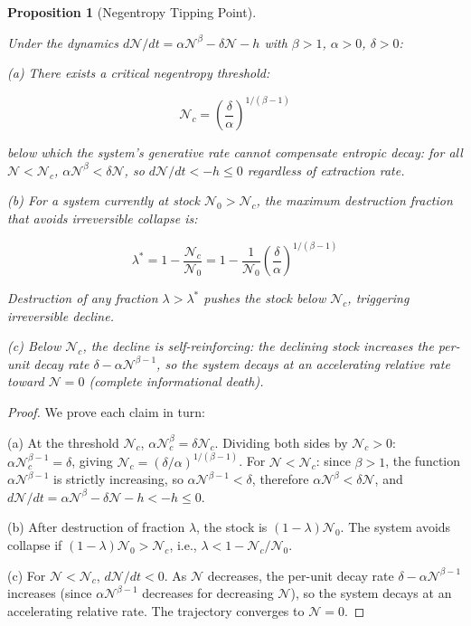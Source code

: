 \documentclass[11pt]{article}
\theoremstyle{plain}
\newtheorem{proposition}[theorem]{Proposition}
\theoremstyle{definition}
\theoremstyle{remark}
\begin{document}
\begin{proposition}[Negentropy Tipping Point]
\label{prop-negentropy-tipping-point}

Under the dynamics $d\mathcal{N}/dt = \alpha\mathcal{N}^\beta - \delta\mathcal{N} - h$ with $\beta > 1$, $\alpha > 0$, $\delta > 0$:

(a) There exists a critical negentropy threshold:

$$\mathcal{N}_c = \left(\frac{\delta}{\alpha}\right)^{1/(\beta-1)}$$

below which the system's generative rate cannot compensate entropic decay: for all $\mathcal{N} < \mathcal{N}_c$, $\alpha\mathcal{N}^\beta < \delta\mathcal{N}$, so $d\mathcal{N}/dt < -h \leq 0$ regardless of extraction rate.

(b) For a system currently at stock $\mathcal{N}_0 > \mathcal{N}_c$, the maximum destruction fraction that avoids irreversible collapse is:

$$\lambda^* = 1 - \frac{\mathcal{N}_c}{\mathcal{N}_0} = 1 - \frac{1}{\mathcal{N}_0}\left(\frac{\delta}{\alpha}\right)^{1/(\beta-1)}$$

Destruction of any fraction $\lambda > \lambda^*$ pushes the stock below $\mathcal{N}_c$, triggering irreversible decline.

(c) Below $\mathcal{N}_c$, the decline is self-reinforcing: the declining stock increases the per-unit decay rate $\delta - \alpha\mathcal{N}^{\beta-1}$, so the system decays at an accelerating relative rate toward $\mathcal{N} = 0$ (complete informational death).
\end{proposition}

\begin{proof}
We prove each claim in turn:

(a) At the threshold $\mathcal{N}_c$, $\alpha\mathcal{N}_c^\beta = \delta\mathcal{N}_c$. Dividing both sides by $\mathcal{N}_c > 0$: $\alpha\mathcal{N}_c^{\beta-1} = \delta$, giving $\mathcal{N}_c = (\delta/\alpha)^{1/(\beta-1)}$. For $\mathcal{N} < \mathcal{N}_c$: since $\beta > 1$, the function $\alpha\mathcal{N}^{\beta-1}$ is strictly increasing, so $\alpha\mathcal{N}^{\beta-1} < \delta$, therefore $\alpha\mathcal{N}^\beta < \delta\mathcal{N}$, and $d\mathcal{N}/dt = \alpha\mathcal{N}^\beta - \delta\mathcal{N} - h < -h \leq 0$.

(b) After destruction of fraction $\lambda$, the stock is $(1-\lambda)\mathcal{N}_0$. The system avoids collapse if $(1-\lambda)\mathcal{N}_0 > \mathcal{N}_c$, i.e., $\lambda < 1 - \mathcal{N}_c/\mathcal{N}_0$.

(c) For $\mathcal{N} < \mathcal{N}_c$, $d\mathcal{N}/dt < 0$. As $\mathcal{N}$ decreases, the per-unit decay rate $\delta - \alpha\mathcal{N}^{\beta-1}$ increases (since $\alpha\mathcal{N}^{\beta-1}$ decreases for decreasing $\mathcal{N}$), so the system decays at an accelerating relative rate. The trajectory converges to $\mathcal{N} = 0$.
\end{proof}
\end{document}
